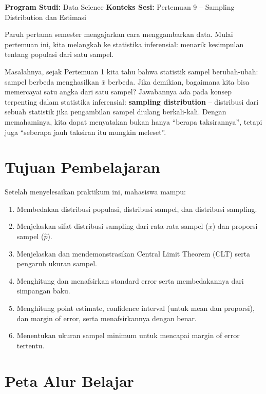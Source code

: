 \documentclass[
  indonesian,
  letterpaper,
]{book}
\providecommand{\tightlist}{%
  \setlength{\itemsep}{0pt}\setlength{\parskip}{0pt}}
\begin{document}
\textbf{Program Studi:} Data Science \textbf{Konteks Sesi:} Pertemuan 9
-- Sampling Distribution dan Estimasi

Paruh pertama semester mengajarkan cara menggambarkan data. Mulai
pertemuan ini, kita melangkah ke statistika inferensial: menarik
kesimpulan tentang populasi dari satu sampel.

Masalahnya, sejak Pertemuan 1 kita tahu bahwa statistik sampel
berubah-ubah: sampel berbeda menghasilkan \(\bar{x}\) berbeda. Jika
demikian, bagaimana kita bisa memercayai satu angka dari satu sampel?
Jawabannya ada pada konsep terpenting dalam statistika inferensial:
\textbf{sampling distribution} -- distribusi dari sebuah statistik jika
pengambilan sampel diulang berkali-kali. Dengan memahaminya, kita dapat
menyatakan bukan hanya ``berapa taksirannya'', tetapi juga ``seberapa
jauh taksiran itu mungkin meleset''.

\section{Tujuan Pembelajaran}\label{tujuan-pembelajaran}

Setelah menyelesaikan praktikum ini, mahasiswa mampu:

\begin{enumerate}
\def\labelenumi{\arabic{enumi}.}
\tightlist
\item
  Membedakan distribusi populasi, distribusi sampel, dan distribusi
  sampling.
\item
  Menjelaskan sifat distribusi sampling dari rata-rata sampel
  (\(\bar{x}\)) dan proporsi sampel (\(\hat{p}\)).
\item
  Menjelaskan dan mendemonstrasikan Central Limit Theorem (CLT) serta
  pengaruh ukuran sampel.
\item
  Menghitung dan menafsirkan standard error serta membedakannya dari
  simpangan baku.
\item
  Menghitung point estimate, confidence interval (untuk mean dan
  proporsi), dan margin of error, serta menafsirkannya dengan benar.
\item
  Menentukan ukuran sampel minimum untuk mencapai margin of error
  tertentu.
\end{enumerate}

\section{Peta Alur Belajar}\label{peta-alur-belajar}
\end{document}
